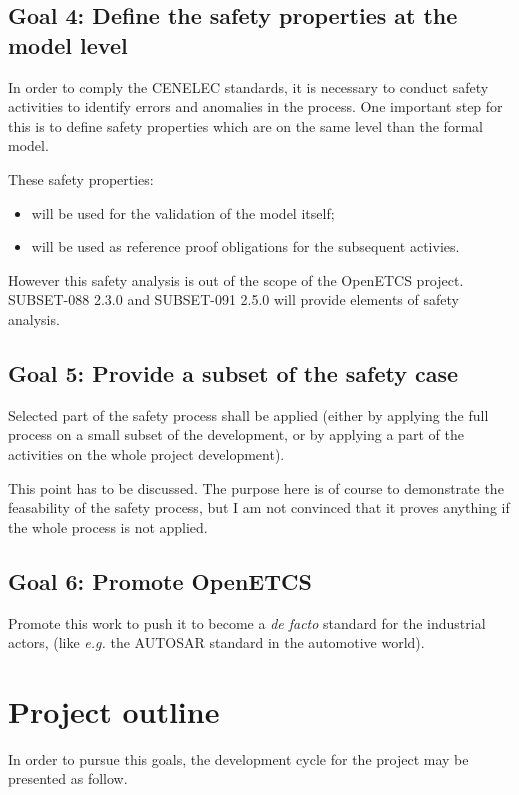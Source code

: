 \documentclass{template/openetcs_article}
\begin{document}
\subsection{Goal 4: Define the safety properties at the model level}
In order to comply the CENELEC standards, it is necessary to conduct safety activities 
to identify errors and anomalies in the process. One important step for this is to define safety 
properties which are on the same level than the formal model.

These safety properties:
\begin{itemize}
\item will be used for the validation of the model itself;
\item will be used as reference proof obligations for the subsequent activies.
\end{itemize}


However this safety analysis is out of the scope of the OpenETCS project. SUBSET-088 2.3.0 and SUBSET-091 2.5.0 will provide elements of safety analysis. 

\subsection{Goal 5: Provide a subset of the safety case}
Selected part of the safety process shall be applied (either by applying the full process on a small
subset of the development, or by applying a part of the activities on the whole project development).

\begin{issue}
This point has to be discussed. The purpose here is of course to demonstrate the feasability 
of the safety process, but I am not convinced that it proves anything if the whole process is 
not applied.
\end{issue}

\subsection{Goal 6: Promote OpenETCS}
Promote this work to push it to become a \emph{de facto} standard for the industrial actors, 
(like \emph{e.g.} the AUTOSAR standard in the automotive world).

\section{Project outline}
In order to pursue this goals, the development cycle for the project may be presented as follow. 
\end{document}

